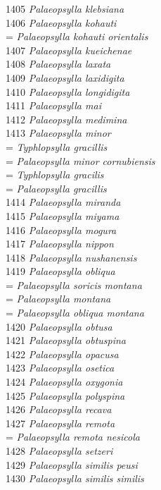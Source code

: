 \documentclass[
]{article}
\begin{document}
1405 \emph{Palaeopsylla klebsiana}\\
1406 \emph{Palaeopsylla kohauti}\\
= \emph{Palaeopsylla kohauti orientalis}\\
1407 \emph{Palaeopsylla kueichenae}\\
1408 \emph{Palaeopsylla laxata}\\
1409 \emph{Palaeopsylla laxidigita}\\
1410 \emph{Palaeopsylla longidigita}\\
1411 \emph{Palaeopsylla mai}\\
1412 \emph{Palaeopsylla medimina}\\
1413 \emph{Palaeopsylla minor}\\
= \emph{Typhlopsylla gracillis}\\
= \emph{Palaeopsylla minor cornubiensis}\\
= \emph{Typhlopsylla gracilis}\\
= \emph{Palaeopsylla gracillis}\\
1414 \emph{Palaeopsylla miranda}\\
1415 \emph{Palaeopsylla miyama}\\
1416 \emph{Palaeopsylla mogura}\\
1417 \emph{Palaeopsylla nippon}\\
1418 \emph{Palaeopsylla nushanensis}\\
1419 \emph{Palaeopsylla obliqua}\\
= \emph{Palaeopsylla soricis montana}\\
= \emph{Palaeopsylla montana}\\
= \emph{Palaeopsylla obliqua montana}\\
1420 \emph{Palaeopsylla obtusa}\\
1421 \emph{Palaeopsylla obtuspina}\\
1422 \emph{Palaeopsylla opacusa}\\
1423 \emph{Palaeopsylla osetica}\\
1424 \emph{Palaeopsylla oxygonia}\\
1425 \emph{Palaeopsylla polyspina}\\
1426 \emph{Palaeopsylla recava}\\
1427 \emph{Palaeopsylla remota}\\
= \emph{Palaeopsylla remota nesicola}\\
1428 \emph{Palaeopsylla setzeri}\\
1429 \emph{Palaeopsylla similis peusi}\\
1430 \emph{Palaeopsylla similis similis}\\
\end{document}
